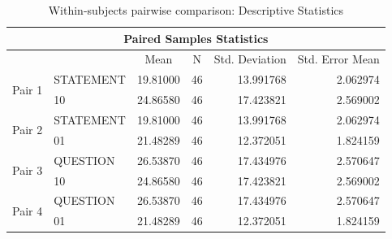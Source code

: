 \documentclass[a4paper]{article}
\begin{document}
\begin{table}[H]
\begin{center}
\caption{Within-subjects pairwise comparison: Descriptive Statistics}
\label{tab:abc}
\begin{tabular}{|l|l|r|r|r|r|} 
\hline
\multicolumn{6}{|c|}{Paired Samples Statistics}                                                                                                                                   \\ 
\hline
                        &                      & \multicolumn{1}{c|}{Mean} & \multicolumn{1}{c|}{N} & \multicolumn{1}{c|}{Std. Deviation} & \multicolumn{1}{c|}{Std. Error Mean}  \\ 
\hline
\multirow{2}{*}{Pair 1} & STATEMENT & 19.81000                  & 46                     & 13.991768                           & 2.062974                              \\ 
\cline{2-6}
                        & 10        & 24.86580                  & 46                     & 17.423821                           & 2.569002                              \\ 
\hline
\multirow{2}{*}{Pair 2} & STATEMENT & 19.81000                  & 46                     & 13.991768                           & 2.062974                              \\ 
\cline{2-6}
                        & 01        & 21.48289                  & 46                     & 12.372051                           & 1.824159                              \\ 
\hline
\multirow{2}{*}{Pair 3} & QUESTION  & 26.53870                  & 46                     & 17.434976                           & 2.570647                              \\ 
\cline{2-6}
                        & 10        & 24.86580                  & 46                     & 17.423821                           & 2.569002                              \\ 
\hline
\multirow{2}{*}{Pair 4} & QUESTION  & 26.53870                  & 46                     & 17.434976                           & 2.570647                              \\ 
\cline{2-6}
                        & 01        & 21.48289                  & 46                     & 12.372051                           & 1.824159                              \\
\hline
\end{tabular}
\end{center}
\end{table}
\end{document}
